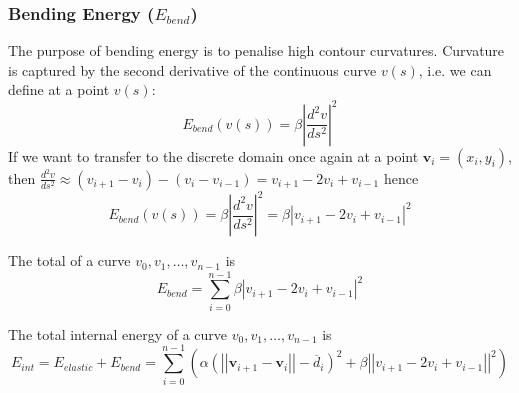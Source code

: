 \documentclass[a4paper]{article}
\begin{document}
 
\subsubsection{Bending Energy ($E_{bend}$)}

The purpose of bending energy is to penalise high contour curvatures. Curvature is captured by the second derivative of the continuous curve $v(s)$, i.e. we can define at a point $v(s)$:
\[
E_{bend}\left(v(s)\right) = \beta\left|\frac{d^2v}{ds^2}\right|^2
\]
If we want to transfer to the discrete domain once again at a point $\textbf{v}_i=(x_i,y_i)$, then $\tfrac{d^2v}{ds^2}\approx (v_{i+1} - v_i) - (v_i - v_{i-1}) =v_{i+1} - 2v_i + v_{i-1}$ hence
\[
E_{bend}\left(v(s)\right)=\beta\left|\frac{d^2v}{ds^2}\right|^2=\beta\left| v_{i+1} - 2v_i + v_{i-1} \right|^2
\]
\begin{definition}
The total  of a curve $v_0, v_1,\ldots, v_{n-1}$ is
\begin{equation}
    E_{bend}=\sum\limits_{i=0}^{n-1} \beta\left| v_{i+1} - 2v_i + v_{i-1} \right|^2
\end{equation}
\end{definition}
\begin{definition}
The total internal energy of a curve $v_0, v_1,\ldots, v_{n-1}$ is
\begin{equation}
    E_{int} = E_{elastic} +  E_{bend}=\sum\limits_{i=0}^{n-1}{\left( \alpha \left(\left|\left|\textbf{v}_{i+1} - \textbf{v}_i \right|\right|- \overline{d}_i\right)^2 +
    \beta\left|\left|  v_{i+1} - 2v_i + v_{i-1} \right|\right|^2 \right)}
    \label{eq:snake_e_int}
\end{equation}
\end{definition}
\end{document}

